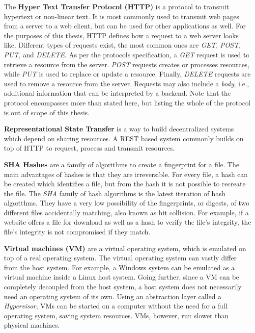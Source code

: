 The \textbf{Hyper Text Transfer Protocol (HTTP)}\cite{http-rfc} is a protocol to transmit hypertext or non-linear text.
It is most commonly used to transmit web pages from a server to a web client, but can be used for other applications as well.
For the purposes of this thesis, HTTP defines how a request to a web server looks like.
Different types of requests exist, the most common ones are \textit{GET}, \textit{POST}, \textit{PUT}, and \textit{DELETE}.
As per the protocols specification, a \textit{GET} request is used to retrieve a resource from the server.
\textit{POST} requests creates or processes resources, while \textit{PUT} is used to replace or update a resource.
Finally, \textit{DELETE} requests are used to remove a resource from the server.
Requests may also include a \textit{body}, i.e., additional information that can be interpreted by a backend.
Note that the protocol encompasses more than stated here, but listing the whole of the protocol is out of scope of this thesis.

\textbf{Representational State Transfer}\cite{extending-representation-state-transfer} is a way to build decentralized systems which depend on sharing resources.
A REST based system commonly builds on top of HTTP to request, process and transmit resources.

\textbf{SHA Hashes}\cite{cryptographic-hash-functions,sha-hashes} are a family of algorithms to create a fingerprint for a file.
The main advantages of hashes is that they are irreversible.
For every file, a hash can be created which identifies a file, but from the hash it is not possible to recreate the file.
The \textit{SHA} family of hash algorithms is the latest iteration of hash algorithms.
They have a very low possibility of the fingerprints, or digests, of two different files accidentally matching, also known as hit collision.
For example, if a website offers a file for download as well as a hash to verify the file's integrity, the file's integrity is not compromised if they match.

\textbf{Virtual machines (VM)}\cite{what-is-a-virtual-machine} are a virtual operating system, which is emulated on top of a real operating system.
The virtual operating system can vastly differ from the host system.
For example, a Windows system can be emulated as a virtual machine inside a Linux host system.
Going further, since a VM can be completely decoupled from the host system, a host system does not necessarily need an operating system of its own.
Using an abstraction layer called a \textit{Hypervisor}, VMs can be started on a computer without the need for a full operating system, saving system resources.
VMs, however, run slower than physical machines.

